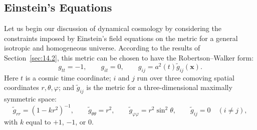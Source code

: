 
\subsection{Einstein's Equations}\label{sec:15.1}

Let us begin our discussion of dynamical cosmology by considering the
constraints imposed by Einstein's field equations on the metric for a general
isotropic and homogeneous universe. According to the results of
Section~\ref{sec:14.2}, this metric can be chosen to have the
Robertson--Walker form:
\begin{equation}
  g_{tt}=-1,\qquad
  g_{it}=0,\qquad
  g_{ij}=a^2(t)\widetilde g_{ij}(\mathbf{x}).
  \tag{15.1.1}\label{eq:15.1.1}
\end{equation}
Here \(t\) is a cosmic time coordinate; \(i\) and \(j\) run over three
comoving spatial coordinates \(r,\theta,\varphi\); and
\(\widetilde g_{ij}\) is the metric for a three-dimensional maximally
symmetric space:
\begin{equation}
  \widetilde g_{rr}=(1-kr^2)^{-1},\qquad
  \widetilde g_{\theta\theta}=r^2,\qquad
  \widetilde g_{\varphi\varphi}=r^2\sin^2\theta,\qquad
  \widetilde g_{ij}=0\quad(i\ne j),
  \tag{15.1.2}\label{eq:15.1.2}
\end{equation}
with \(k\) equal to \(+1\), \(-1\), or \(0\).

